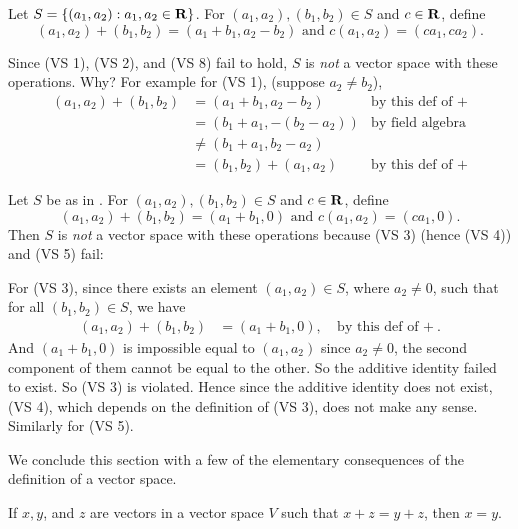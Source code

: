 \begin{example} \label{example 1.2.6}
Let \(S = \{ (a_1, a_2) : a_1, a_2 \in \mathbf{R} \}\).
For \((a_1, a_2), (b_1, b_2) \in S\) and \(c \in \mathbf{R}\), define
\[
    (a_1, a_2) + (b_1, b_2) = (a_1 + b_1, a_2 - b_2) \text{ and } c(a_1, a_2) = (c a_1, c a_2).
\]

Since  (VS 1), (VS 2), and (VS 8) fail to hold, \(S\) is \emph{not} a vector space with these operations.
Why?
For example for (VS 1), (suppose \(a_2 \ne b_2\)),
\begin{align*}
    (a_1, a_2) + (b_1, b_2) & = (a_1 + b_1, a_2 - b_2) & \text{by this def of \(+\)} \\
                             & = (b_1 + a_1, -(b_2 - a_2)) & \text{by field algebra} \\
                             & \ne (b_1 + a_1, b_2 - a_2) & \\
                             & = (b_1, b_2) + (a_1, a_2) & \text{by this def of \(+\)}
\end{align*}
\end{example}

\begin{example} \label{example 1.2.7}
Let \(S\) be as in .
For \((a_1, a_2), (b_1, b_2) \in S\) and \(c \in \mathbf{R}\), define
\[
    (a_1, a_2) + (b_1, b_2) = (a_1 + b_1, 0) \text{ and } c(a_1, a_2) = (c a_1, 0).
\]
Then \(S\) is \emph{not} a vector space with these operations because  (VS 3) (hence (VS 4)) and (VS 5) fail:

For (VS 3), since there exists an element \((a_1, a_2) \in S\), where \(a_2 \ne 0\), such that for all \((b_1, b_2) \in S\), we have
\begin{align*}
    (a_1, a_2) + (b_1, b_2) & = (a_1 + b_1, 0), & \text{by this def of \(+\)}.
\end{align*}
And \((a_1 + b_1, 0)\) is impossible equal to \((a_1, a_2)\) since \(a_2 \ne 0\), the second component of them cannot be equal to the other.
So the additive identity failed to exist.
So (VS 3) is violated.
Hence since the additive identity does not exist, (VS 4), which depends on the definition of (VS 3), does not make any sense.
Similarly for (VS 5).
\end{example}

We conclude this section with a few of the elementary consequences of the definition of a vector space.
\begin{theorem}  \label{thm 1.1}
If \(x, y\), and \(z\) are vectors in a vector space \(V\) such that \(x + z = y + z\), then \(x = y\).
\end{theorem}

